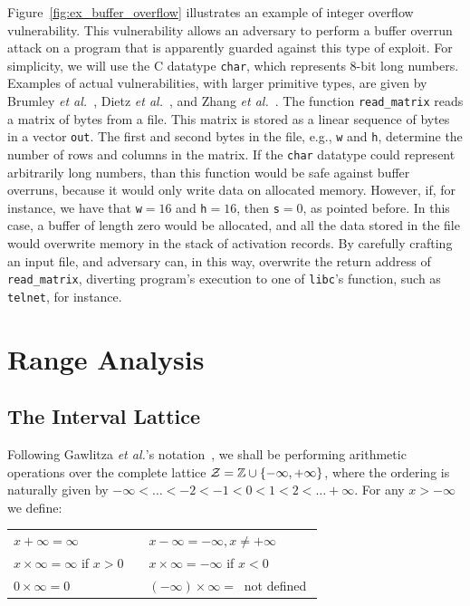\documentclass[preprint]{sigplanconf}[10pt]
\begin{document}
Figure~\ref{fig:ex_buffer_overflow} illustrates an example of integer
overflow vulnerability.
This vulnerability allows an adversary to perform a buffer overrun attack
on a program that is apparently guarded against this type of exploit.
For simplicity, we will use the C datatype \texttt{char}, which represents
8-bit long numbers.
Examples of actual vulnerabilities, with larger primitive types, are given
by Brumley {\em et al.}~\cite{Brumley07}, Dietz {\em et al.}~\cite{Dietz12}, and
Zhang {\em et al.}~\cite{Zhang09}.
The function \texttt{read\_matrix} reads a matrix of bytes from a file.
This matrix is stored as a linear sequence of bytes in a vector \texttt{out}.
The first and second bytes in the file, e.g., \texttt{w} and \texttt{h},
determine the number of rows and columns in the matrix.
If the \texttt{char} datatype could represent arbitrarily long numbers, than this
function would be safe against buffer overruns, because it would only write data
on allocated memory.
However, if, for instance, we have that \texttt{w}$= 16$ and \texttt{h}$= 16$,
then \texttt{s}$= 0$, as pointed before.
In this case, a buffer of length zero would be allocated, and all the data
stored in the file would overwrite memory in the stack of activation records.
By carefully crafting an input file, and adversary can, in this way, overwrite
the return address of \texttt{read\_matrix}, diverting program's execution to
one of \texttt{libc}'s function, such as \texttt{telnet}, for instance.

\section{Range Analysis}
\label{sec:range}

\subsection{The Interval Lattice}
\label{sub:lattice}

Following Gawlitza {\em et al.}'s notation~\cite{Gawlitza09}, we shall be
performing arithmetic operations over the complete lattice
$\cal{Z} = \mathbb{Z} \cup \{-\infty, +\infty\}$, where the ordering is
naturally given by $-\infty < \ldots < -2 < -1 < 0 < 1 < 2 < \ldots +\infty$.
For any $x > -\infty$ we define:

\begin{tabular}{lcl}
$x + \infty = \infty$ & \mbox{\hspace{0.1cm}} & $x - \infty = - \infty, x \neq +\infty$ \\
$x \times \infty = \infty$ if $x > 0$ & & $x \times \infty = -\infty$ if $x < 0$ \\
$0 \times \infty = 0$ & & $(-\infty) \times \infty = \ $ not defined $$ \\
\end{tabular}
\end{document}

